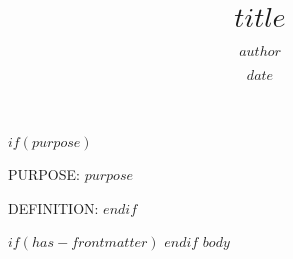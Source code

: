 \documentclass[12pt]{sog}
\title{$title$}
\date{$date$}
\author{$author$}
\begin{document}
\maketitle

%

$if(purpose)$
\par PURPOSE: $purpose$

\par DEFINITION:
$endif$

$if(has-frontmatter)$
\mainmatter
$endif$
$body$
\end{document}
